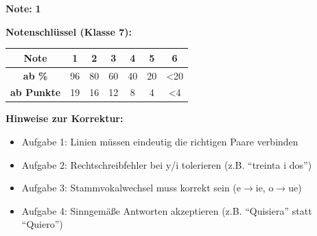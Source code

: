 \documentclass[11pt, a4paper]{article}
\newcommand{\lsg}[1]{\textcolor{loesung}{\textbf{#1}}}
\begin{document}
\begin{flushright}
\textbf{Note:} \lsg{1}
\end{flushright}

\vspace{1em}

\textbf{Notenschlüssel (Klasse 7):}

\begin{tabular}{|c|c|c|c|c|c|c|}
\hline
\textbf{Note} & 1 & 2 & 3 & 4 & 5 & 6 \\
\hline
\textbf{ab \%} & 96 & 80 & 60 & 40 & 20 & <20 \\
\hline
\textbf{ab Punkte} & 19 & 16 & 12 & 8 & 4 & <4 \\
\hline
\end{tabular}

\vspace{1em}

\textbf{Hinweise zur Korrektur:}
\begin{itemize}[noitemsep]
    \item Aufgabe 1: Linien müssen eindeutig die richtigen Paare verbinden
    \item Aufgabe 2: Rechtschreibfehler bei y/i tolerieren (z.B. ``treinta i dos'')
    \item Aufgabe 3: Stammvokalwechsel muss korrekt sein (e$\rightarrow$ie, o$\rightarrow$ue)
    \item Aufgabe 4: Sinngemäße Antworten akzeptieren (z.B. ``Quisiera'' statt ``Quiero'')
\end{itemize}
\end{document}
